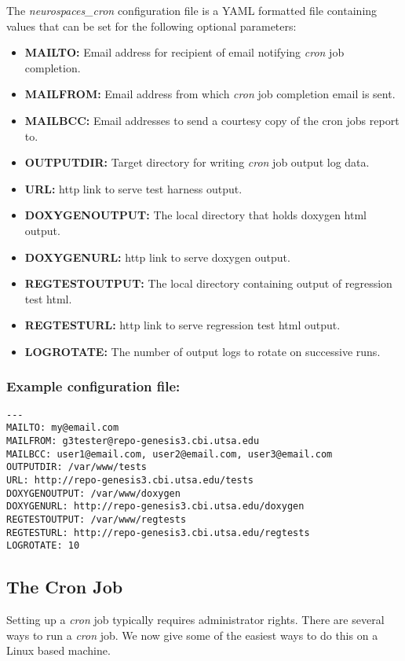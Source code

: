 \documentclass[12pt]{article}
\begin{document}
The  {\it neurospaces\_cron} configuration file is a YAML formatted file containing values that can be set for the following optional parameters:
\begin{itemize}
   \item[]{\bf MAILTO:} Email address for recipient of email notifying {\it cron} job completion.
   \item[]{\bf MAILFROM:} Email address from which {\it cron} job completion email is sent.
   \item[]{\bf MAILBCC:} Email addresses to send a courtesy copy of the cron jobs report to.  
   \item[]{\bf OUTPUTDIR:} Target directory for writing {\it cron} job output log data.
   \item[]{\bf URL:} http link to serve test harness output.
   \item[]{\bf DOXYGENOUTPUT:} The local directory that holds doxygen html output.
   \item[]{\bf DOXYGENURL:} http link to serve doxygen output.
   \item[]{\bf REGTESTOUTPUT:} The local directory containing output of regression test html.
   \item[]{\bf REGTESTURL:} http link to serve regression test html output.
   \item[]{\bf LOGROTATE:} The number of output logs to rotate on successive runs.
\end{itemize}

\subsubsection*{Example configuration file:}

\begin{verbatim}
---
MAILTO: my@email.com
MAILFROM: g3tester@repo-genesis3.cbi.utsa.edu
MAILBCC: user1@email.com, user2@email.com, user3@email.com
OUTPUTDIR: /var/www/tests
URL: http://repo-genesis3.cbi.utsa.edu/tests
DOXYGENOUTPUT: /var/www/doxygen
DOXYGENURL: http://repo-genesis3.cbi.utsa.edu/doxygen
REGTESTOUTPUT: /var/www/regtests
REGTESTURL: http://repo-genesis3.cbi.utsa.edu/regtests
LOGROTATE: 10

\end{verbatim}

\subsection*{The Cron Job}

Setting up a {\it cron} job typically requires administrator rights. There are several ways to run a {\it cron} job. We now give some of the easiest ways to do this on a Linux based machine.
\end{document}
